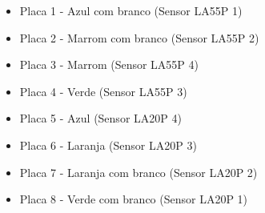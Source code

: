 \begin{apendicesenv}
\begin{itemize}
    \item Placa 1 - Azul com branco (Sensor LA55P 1)
    \item Placa 2 - Marrom com branco (Sensor LA55P 2)
    \item Placa 3 - Marrom (Sensor LA55P 4)
    \item Placa 4 - Verde (Sensor LA55P 3)
    \item Placa 5 - Azul (Sensor LA20P 4)
    \item Placa 6 - Laranja (Sensor LA20P 3)
    \item Placa 7 - Laranja com branco (Sensor LA20P 2)
    \item Placa 8 - Verde com branco (Sensor LA20P 1)
\end{itemize}

\end{apendicesenv}
